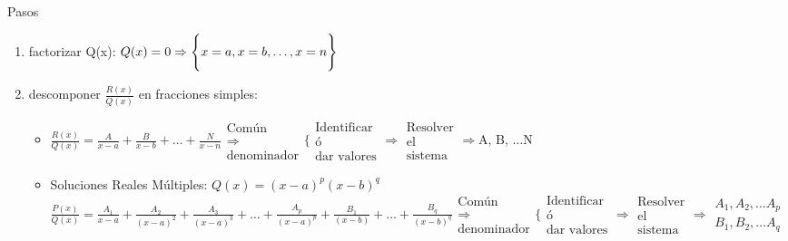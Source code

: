 \documentclass[8pt]{article}
\begin{document}
				Pasos
			\begin{enumerate}
				\item factorizar Q(x): $ Q(x) = 0 \Rightarrow
					\Bigg{ \{ } 
						x = a, 
						x = b, 
						\dots,
						x = n 
					\Bigg{ \} } $
				\item descomponer $ \frac{R(x)}{Q(x)} $ en fracciones simples:
					\begin{itemize}
						\item $ \frac{R(x)}{Q(x)} = \frac{A}{x-a} + \frac{B}{x-b}
							+ \dots + \frac{N}{x-n}
							\begin{array}{c}
								\text{Común}\\
								\Rightarrow\\
								\text{denominador}
							\end{array}
							\Bigg \{ %
							\begin{array}{c}
								\text{Identificar}\\
								\text{ó}\\
								\text{dar valores}
							\end{array}
							\Rightarrow
							\begin{array}{c}
								\text{Resolver}\\
								\text{el}\\
								\text{sistema}
							\end{array} \Rightarrow \text{A, B, } \dots \text{N}$

						\item Soluciones Reales Múltiples: $ Q(x) = (x-a)^p (x-b)^q $
							$ \frac{P(x)}{Q(x)} = \frac{A_1}{x-a} +
							\frac{A_2}{(x-a)^2} + \frac{A_3}{(x-a)^3} + \dots +
							\frac{A_p}{(x-a)^p} + \frac{B_1}{(x-b)} + \dots +
							\frac{B_q}{(x-b)^q} 
							\begin{array}{c}
								\text{Común}\\
								\Rightarrow\\
								\text{denominador}
							\end{array}
							\Bigg \{
							\begin{array}{c}
								\text{Identificar}\\
								\text{ó}\\
								\text{dar valores}
							\end{array}
							\Rightarrow
							\begin{array}{c}
								\text{Resolver}\\
								\text{el}\\
								\text{sistema}
							\end{array} \Rightarrow 
							\begin{array}{l}
								A_1, A_2, \dots A_p\\
								B_1, B_2, \dots A_q
							\end{array}$


\end{itemize}
\end{enumerate}
\end{document}
